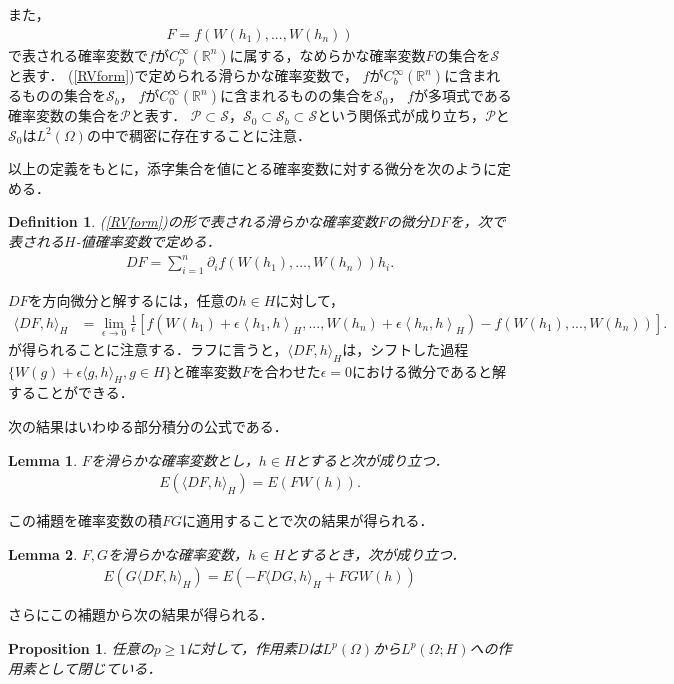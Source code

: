 \documentclass[a4paper,10pt]{jsarticle}
\theoremstyle{plain}
\newtheorem{definition}{Definition}
\newtheorem{lemma}{Lemma}
\newtheorem{proposition}{Proposition}
\newcommand{\eq}[1]{\begin{align}#1\end{align}}
\begin{document}
また，
\eq{F=f(W(h_1),...,W(h_n))\label{RVform}}
で表される確率変数で$f$が$C_p^\infty(\mathbb{R}^n)$に属する，なめらかな確率変数$F$の集合を$\mathcal{S}$と表す．
(\ref{RVform})で定められる滑らかな確率変数で，
$f$が$C_b^\infty(\mathbb{R}^n)$に含まれるものの集合を$\mathcal{S}_b$，
$f$が$C_0^\infty(\mathbb{R}^n)$に含まれるものの集合を$\mathcal{S}_0$，
$f$が多項式である確率変数の集合を$\mathcal{P}$と表す．
$\mathcal{P}\subset\mathcal{S}$，$\mathcal{S}_0\subset\mathcal{S}_b\subset\mathcal{S}$という関係式が成り立ち，$\mathcal{P}$と$\mathcal{S}_0$は$L^2(\Omega)$の中で稠密に存在することに注意．

以上の定義をもとに，添字集合を値にとる確率変数に対する微分を次のように定める．
\begin{definition}
(\ref{RVform})の形で表される滑らかな確率変数$F$の微分$DF$を，次で表される$H$-値確率変数で定める．
\eq{DF=\sum_{i=1}^n\partial_if(W(h_1),...,W(h_n))h_i.}
\end{definition}
$DF$を方向微分と解するには，任意の$h\in H$に対して，
\eq{\langle DF,h\rangle_H
	&=\lim_{\epsilon\rightarrow0}\frac{1}{\epsilon}\left[f(W(h_1)+\epsilon\left\langle h_1,h\right\rangle_H,...,W(h_n)+\epsilon\left\langle h_n,h\right\rangle_H)-f(W(h_1),...,W(h_n))\right].}
が得られることに注意する．ラフに言うと，$\langle DF,h\rangle_H$は，シフトした過程$\{W(g)+\epsilon\langle g,h\rangle_H,g\in H\}$と確率変数$F$を合わせた$\epsilon=0$における微分であると解することができる．

次の結果はいわゆる部分積分の公式である．
\begin{lemma}\label{lem1.2.1}
$F$を滑らかな確率変数とし，$h\in H$とすると次が成り立つ．
\eq{E\left(\langle DF,h\rangle_H\right)=E\left(FW(h)\right).}
\end{lemma}
この補題を確率変数の積$FG$に適用することで次の結果が得られる．
\begin{lemma}\label{lem1.2.2}
$F,G$を滑らかな確率変数，$h\in H$とするとき，次が成り立つ．
\eq{E\left(G\langle DF,h\rangle_H\right)=E\left(-F\langle DG,h\rangle_H+FGW(h)\right)}
\end{lemma}
さらにこの補題から次の結果が得られる．
\begin{proposition}\label{prop1.2.1}
任意の$p\ge1$に対して，作用素$D$は$L^p(\Omega)$から$L^p(\Omega;H)$への作用素として閉じている．
\end{proposition}
\end{document}
